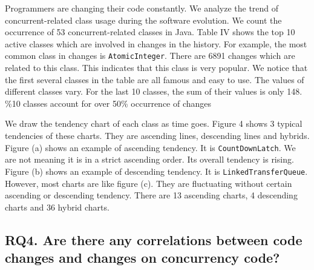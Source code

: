 Programmers are changing their code constantly. We analyze the trend of concurrent-related class usage during the software evolution. We count the occurrence of 53 concurrent-related classes in Java. Table IV shows the top 10 active classes which are involved in changes in the history. For example, the most common class in changes is \texttt{AtomicInteger}. There are 6891 changes which are related to this class. This indicates that this class is very popular. We notice that the first several classes in the table are all famous and easy to use. The values of different classes vary. For the last 10 classes, the sum of their values is only 148. \%10 classes account for over 50\% occurrence of changes

We draw the tendency chart of each class as time goes. Figure 4 shows 3 typical tendencies of these charts. They are ascending lines, descending lines and hybrids. Figure (a) shows an example of ascending tendency. It is \texttt{CountDownLatch}. We are not meaning it is in a strict ascending order. Its overall tendency is rising. Figure (b) shows an example of descending tendency. It is \texttt{LinkedTransferQueue}. However, most charts are like figure (c). They are fluctuating without certain ascending or descending tendency. There are 13 ascending charts, 4 descending charts and 36 hybrid charts.



\subsection{RQ4. Are there any correlations between code changes and changes on concurrency code?}

